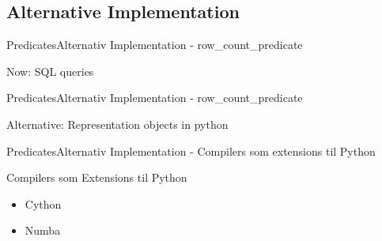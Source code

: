 


\subsection{Alternative Implementation}
\begin{frame}{Predicates}{Alternativ Implementation - row\_count\_predicate}
	\begin{block}{Now: SQL queries}
	\end{block}
\end{frame}

\begin{frame}{Predicates}{Alternativ Implementation - row\_count\_predicate}
	\begin{block}{Alternative: Representation objects in python}
	\end{block}
\end{frame}

\begin{frame}{Predicates}{Alternativ Implementation - Compilers som extensions til Python}
	\begin{block}{Compilers som Extensions til Python}
		\begin{itemize}
			\item<1-> Cython
			\item<1-> Numba
		\end{itemize}
	\end{block}
\end{frame}

	
